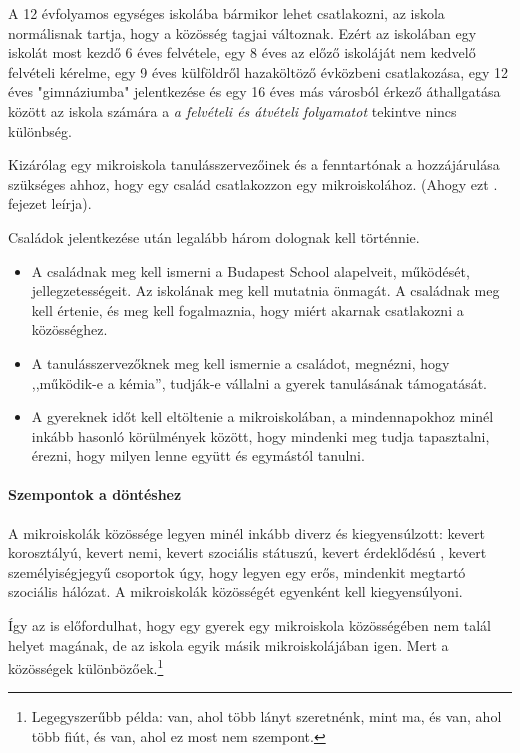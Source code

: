 A 12 évfolyamos egységes iskolába bármikor lehet csatlakozni, az iskola
normálisnak tartja, hogy a közösség tagjai változnak.
Ezért az iskolában egy iskolát most kezdő 6 éves felvétele, egy 8 éves az előző
iskoláját nem kedvelő felvételi kérelme, egy 9 éves
külföldről hazaköltöző évközbeni csatlakozása, egy 12 éves "gimnáziumba"
jelentkezése és egy 16 éves más városból érkező áthallgatása között az iskola
számára
a \emph{a felvételi és átvételi folyamatot} tekintve nincs különbség.

Kizárólag egy mikroiskola tanulásszervezőinek és a fenntartónak a hozzájárulása
szükséges ahhoz, hogy
egy család csatlakozzon egy mikroiskolához. (Ahogy ezt
. fejezet leírja).

Családok jelentkezése után legalább három dolognak kell történnie.
\begin{itemize}
      \item A családnak meg kell ismerni a Budapest School alapelveit,
            működését, jellegzetességeit. Az iskolának meg kell mutatnia
            önmagát. A
            családnak meg kell értenie,  és meg kell fogalmaznia, hogy miért
            akarnak
            csatlakozni a közösséghez.
      \item A tanulásszervezőknek meg kell ismernie a családot, megnézni, hogy
            ,,működik-e a kémia'', tudják-e vállalni a gyerek tanulásának
            támogatását.
      \item A gyereknek időt kell eltöltenie a mikroiskolában, a mindennapokhoz
            minél inkább hasonló körülmények között, hogy mindenki meg tudja
            tapasztalni,
            érezni, hogy milyen lenne együtt és egymástól tanulni.
\end{itemize}

\paragraph{Szempontok a döntéshez}
A mikroiskolák közössége legyen minél inkább diverz és kiegyensúlzott: kevert
korosztályú, kevert nemi, kevert szociális státuszú, kevert
érdeklődésú , kevert személyiségjegyű csoportok úgy, hogy legyen egy erős,
mindenkit megtartó szociális
hálózat. A mikroiskolák közösségét egyenként kell kiegyensúlyoni.

Így az is előfordulhat, hogy egy gyerek egy mikroiskola közösségében nem talál
helyet magának, de az iskola egyik másik mikroiskolájában igen. Mert a
közösségek különbözőek.\footnote{Legegyszerűbb példa: van, ahol több lányt
      szeretnénk, mint ma, és van, ahol több fiút, és van, ahol ez most nem
      szempont.}

